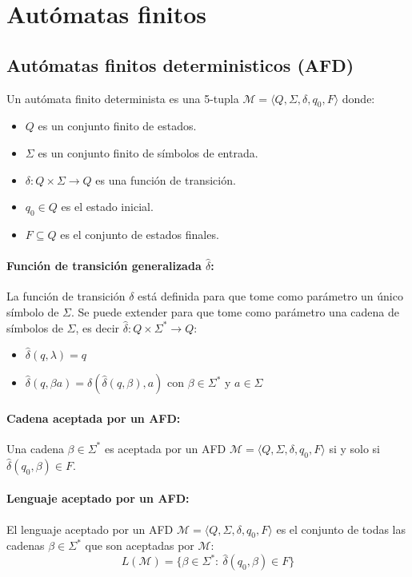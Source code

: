 \section{Autómatas finitos}
\subsection{Autómatas finitos deterministicos (AFD)}
Un autómata finito determinista es una 5-tupla \(\mathcal{M}=\langle Q,\Sigma,\delta,q_0,F\rangle\) donde:
\begin{itemize}
  \item \(Q\) es un conjunto finito de estados.
  \item \(\Sigma\) es un conjunto finito de símbolos de entrada.
  \item \(\delta:Q\times\Sigma\to Q\) es una función de transición.
  \item \(q_0\in Q\) es el estado inicial.
  \item \(F\subseteq Q\) es el conjunto de estados finales.
\end{itemize}

\paragraph{Función de transición generalizada \(\hat{\delta}\):} La función de transición \(\delta\) está definida para que tome como parámetro un único símbolo de \(
\Sigma\). Se puede extender para que tome como parámetro una cadena de símbolos de \(\Sigma\), es decir \(\hat{\delta} : Q\times\Sigma^*\to Q\):
\begin{itemize}
  \item \(\hat{\delta}(q,\lambda)=q\)
  \item \(\hat{\delta}(q,\beta a)=\delta(\hat{\delta}(q,\beta),a)\) con \(\beta\in\Sigma^*\) y \(a\in\Sigma\)
\end{itemize}

\paragraph{Cadena aceptada por un AFD:} Una cadena \(\beta\in\Sigma^*\) es aceptada por un AFD \(\mathcal{M} = \langle Q, \Sigma, \delta, q_0, F\rangle\) si y solo si \(\hat{\delta}(q_0,\beta)\in F\).

\paragraph{Lenguaje aceptado por un AFD:} El lenguaje aceptado por un AFD \(\mathcal{M} = \langle Q, \Sigma, \delta, q_0, F\rangle\) es el conjunto de todas las cadenas \(\beta\in\Sigma^*\) que son aceptadas por \(\mathcal{M}\):
\[ L(\mathcal{M}) = \{ \beta\in\Sigma^*:~\hat{\delta}(q_0,\beta)\in F\}\]

